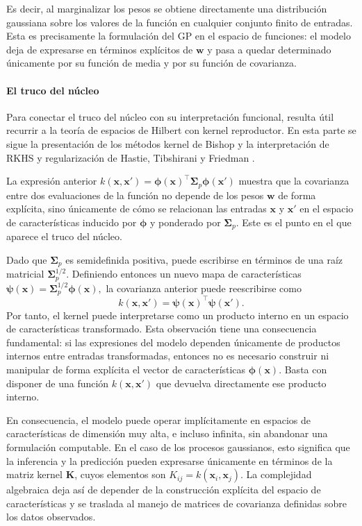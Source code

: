 Es decir, al marginalizar los pesos se obtiene directamente una distribución gaussiana sobre
los valores de la función en cualquier conjunto finito de entradas. Esta es precisamente la
formulación del GP en el espacio de funciones: el modelo deja de expresarse
en términos explícitos de \(\bm{w}\) y pasa a quedar determinado únicamente por su función
de media y por su función de covarianza.

\paragraph{El truco del núcleo}
\label{subsec:truco_del_kernel}

Para conectar el truco del núcleo con su interpretación funcional, resulta útil recurrir
a la teoría de espacios de Hilbert con kernel reproductor. En esta parte se sigue la
presentación de los métodos kernel de Bishop \cite{bishop2006prml} y la interpretación
de RKHS y regularización de Hastie, Tibshirani y Friedman \cite{hastie2009elements}.
\vspace{0.3cm}

La expresión anterior
\(
k(\bm{x},\bm{x}')
=
\bm{\phi}(\bm{x})^\top \bm{\Sigma}_p \bm{\phi}(\bm{x}')
\)
muestra que la covarianza entre dos evaluaciones de la función no depende de los pesos
\(\bm{w}\) de forma explícita, sino únicamente de cómo se relacionan las entradas
\(\bm{x}\) y \(\bm{x}'\) en el espacio de características inducido por \(\bm{\phi}\) y ponderado
por \(\bm{\Sigma}_p\). Este es el punto en el que aparece el truco del núcleo.

Dado que \(\bm{\Sigma}_p\) es semidefinida positiva, puede escribirse en términos de una raíz
matricial \(\bm{\Sigma}_p^{1/2}\). Definiendo entonces un nuevo mapa de características
$
\bm{\psi}(\bm{x})=\bm{\Sigma}_p^{1/2}\bm{\phi}(\bm{x}),
$
la covarianza anterior puede reescribirse como
\[
k(\bm{x},\bm{x}')
=
\bm{\psi}(\bm{x})^\top \bm{\psi}(\bm{x}').
\]
Por tanto, el kernel puede interpretarse como un producto interno en un espacio de
características transformado. Esta observación tiene una consecuencia fundamental: si las
expresiones del modelo dependen únicamente de productos internos entre entradas
transformadas, entonces no es necesario construir ni manipular de forma explícita el vector
de características \(\bm{\phi}(\bm{x})\). Basta con disponer de una función
\(k(\bm{x},\bm{x}')\) que devuelva directamente ese producto interno.

En consecuencia, el modelo puede operar implícitamente en espacios de características de
dimensión muy alta, e incluso infinita, sin abandonar una formulación computable. En el
caso de los procesos gaussianos, esto significa que la inferencia y la predicción pueden
expresarse únicamente en términos de la matriz kernel \(\bm{K}\), cuyos elementos son
\(
K_{ij}=k(\bm{x}_i,\bm{x}_j).
\)
La complejidad algebraica deja así de depender de la construcción explícita del espacio de
características y se traslada al manejo de matrices de covarianza definidas sobre los datos
observados.

